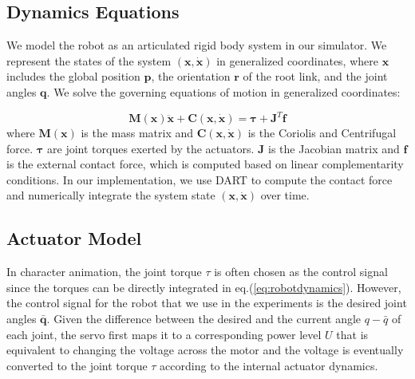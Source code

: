 \subsection{Dynamics Equations}

We model the robot as an articulated rigid body system in our simulator. We represent the states of the system $(\mathbf{x}, \dot{\mathbf{x}})$ in generalized coordinates, where $\mathbf{x}$ includes the global position $\mathbf{p}$, the orientation $\mathbf{r}$ of the root link, and the joint angles $\mathbf{q}$. We solve the governing equations of motion in generalized coordinates:

\begin{equation}
\label{eq:robotdynamics}
\mathbf{M}(\mathbf{x})\mathbf{\ddot{x}}+\mathbf{C}(\mathbf{x},\mathbf{\dot{x}})=\mathbf{\tau}+\mathbf{J}^T\mathbf{f}
\end{equation}
where $\mathbf{M}(\mathbf{x})$ is the mass matrix and $\mathbf{C}(\mathbf{x},\mathbf{\dot{x}})$ is the Coriolis and Centrifugal force. $\mathbf{\tau}$ are joint torques exerted by the actuators. $\mathbf{J}$ is the Jacobian matrix and $\mathbf{f}$ is the external contact force, which is computed based on linear complementarity conditions. In our implementation, we use DART to compute the contact force and numerically integrate the system state $(\mathbf{x}, \dot{\mathbf{x}})$ over time.

\subsection{Actuator Model}
\label{sec:motorDynamics}
In character animation, the joint torque $\tau$ is often chosen as the control signal since the torques can be directly integrated in eq.(\ref{eq:robotdynamics}). However, the control signal for the robot that we use in the experiments is the desired joint angles $\bar{\mathbf{q}}$. Given the difference between the desired and the current angle ${q-\bar{q}}$ of each joint, the servo first maps it to a corresponding power level $U$ that is equivalent to changing the voltage across the motor and the voltage is eventually converted to the joint torque $\tau$ according to the internal actuator dynamics.

